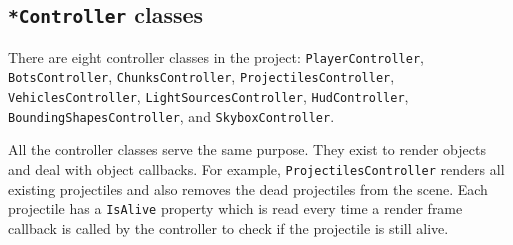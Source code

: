 \subsection{\texttt{*Controller} classes}
There are eight controller classes in the project:
\texttt{PlayerController},
\texttt{BotsController},
\texttt{ChunksController},
\texttt{ProjectilesController},
\texttt{VehiclesController},
\texttt{LightSourcesController},
\texttt{HudController},
\texttt{BoundingShapesController}, and
\texttt{SkyboxController}.

All the controller classes serve the same purpose.
They exist to render objects and deal with object callbacks.
For example, \texttt{ProjectilesController} renders all existing projectiles and also removes the dead projectiles from the scene.
Each projectile has a \texttt{IsAlive} property which is read every time a render frame callback is called by the controller to check if the projectile is still alive.
